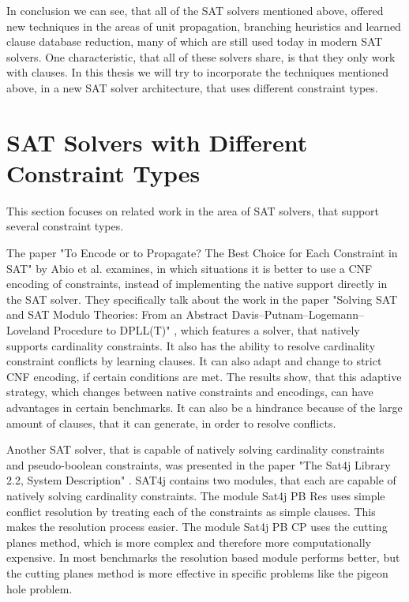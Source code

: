 In conclusion we can see, that all of the SAT solvers mentioned above, offered new techniques in the areas of unit propagation, branching heuristics and learned clause database reduction, many of which are still used today in modern SAT solvers. One characteristic, that all of these solvers share, is that they only work with clauses. In this thesis we will try to incorporate the techniques mentioned above, in a new SAT solver architecture, that uses different constraint types.

\section{SAT Solvers with Different Constraint Types}
This section focuses on related work in the area of SAT solvers, that support several constraint types.

The paper "To Encode or to Propagate? The Best Choice for Each Constraint in SAT" \cite{abio2013encode} by Abio et al. examines, in which situations it is better to use a CNF encoding of constraints, instead of implementing the native support directly in the SAT solver. They specifically talk about the work in the paper "Solving SAT and SAT Modulo Theories: From an Abstract
Davis–Putnam–Logemann–Loveland Procedure to DPLL(T)" \cite{nieuwenhuis2006solving}, which features a solver, that natively supports cardinality constraints. It also has the ability to resolve cardinality constraint conflicts by learning clauses. It can also adapt and change to strict CNF encoding, if certain conditions are met. The results show, that this adaptive strategy, which changes between native constraints and encodings, can have advantages in certain benchmarks. It can also be a hindrance because of the large amount of clauses, that it can generate, in order to resolve conflicts.

Another SAT solver, that is capable of natively solving cardinality constraints and pseudo-boolean constraints, was presented in the paper "The Sat4j Library 2.2, System Description" \cite{le2010sat4j}. SAT4j contains two modules, that each are capable of natively solving cardinality constraints. The module Sat4j PB Res uses simple conflict resolution by treating each of the constraints as simple clauses. This makes the resolution process easier. The module Sat4j PB CP uses the cutting planes method, which is more complex and therefore more computationally expensive. In most benchmarks the resolution based module performs better, but the cutting planes method is more effective in specific problems like the pigeon hole problem.

